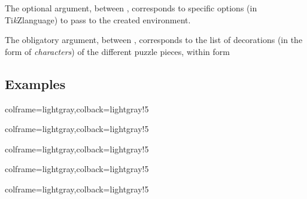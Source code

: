 \documentclass[11pt,a4paper]{ltxdoc}
\providecommand\tikzlogo{Ti\textit{k}Z}
\let\TikZ\tikzlogo
\begin{document}
\medskip

The optional argument, between , corresponds to specific options (in \TikZ language) to pass to the created environment.

\smallskip

The obligatory argument, between , corresponds to the list of decorations (in the form of \textit{characters}) of the different puzzle pieces, within form 

\subsection{Examples}

\begin{tcblisting}{colframe=lightgray,colback=lightgray!5}
\ThematicPuzzle{\faAngry,\faArchway,\faAtlas,\faAtom}
\end{tcblisting}

\begin{tcblisting}{colframe=lightgray,colback=lightgray!5}
\ThematicPuzzle[Labels={Maths,History,Geo,Chemistry}]%
  {\faAngry,\faArchway,\faAtlas,\faAtom}
\end{tcblisting}

\begin{tcblisting}{colframe=lightgray,colback=lightgray!5}
\ThematicPuzzle%
  [Scale=2,BgColors=yellow!25,Labels={Maths,History,Geo,Chemistry}]%
  {\faAngry,\faArchway,\faAtlas,\faAtom}
\end{tcblisting}

\begin{tcblisting}{colframe=lightgray,colback=lightgray!5}
\ThematicPuzzle%
  [Scale=3,BgColors={yellow!10,orange!10,red!10,teal!10},
  Labels={Maths,History,Geo,Chemistry}]%
  {\faAngry,\faArchway,\faAtlas,\faAtom}
\end{tcblisting}

\begin{tcblisting}{colframe=lightgray,colback=lightgray!5}
\end{tcblisting}
\end{document}
